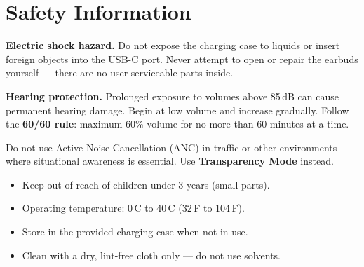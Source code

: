 \section{Safety Information}

\begin{dangerbox}
  \textbf{Electric shock hazard.} Do not expose the charging case to liquids or insert foreign
  objects into the USB-C port. Never attempt to open or repair the earbuds yourself —
  there are no user-serviceable parts inside.
\end{dangerbox}

\vspace{4pt}

\begin{warningbox}
  \textbf{Hearing protection.} Prolonged exposure to volumes above 85\,dB can cause permanent
  hearing damage. Begin at low volume and increase gradually. Follow the \textbf{60/60 rule}:
  maximum 60\% volume for no more than 60 minutes at a time.
\end{warningbox}

\vspace{4pt}

\begin{warningbox}[title={\faCar\enspace\textbf{Traffic Safety}}, colframe=warnborder, coltitle=warnborder]
  Do not use Active Noise Cancellation (ANC) in traffic or other environments where
  situational awareness is essential. Use \textbf{Transparency Mode} instead.
\end{warningbox}

\vspace{4pt}

\begin{itemize}[itemsep=2pt, parsep=0pt, leftmargin=1.4em]
  \item[\faCheckCircle] Keep out of reach of children under 3 years (small parts).
  \item[\faCheckCircle] Operating temperature: 0\,\textdegree{}C to 40\,\textdegree{}C (32\,\textdegree{}F to 104\,\textdegree{}F).
  \item[\faCheckCircle] Store in the provided charging case when not in use.
  \item[\faCheckCircle] Clean with a dry, lint-free cloth only — do not use solvents.
\end{itemize}


